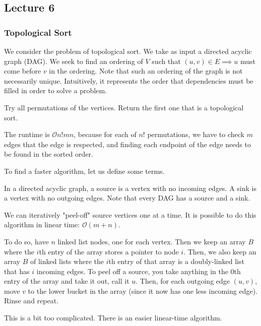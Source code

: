 \subsection{Lecture 6}

\subsubsection{Topological Sort}

We consider the problem of topological sort. We take as input a directed acyclic graph (DAG).
We seek to find an ordering of $V$ such that $(u, v) \in E \implies u$ must come before $v$ in the ordering. Note that such an ordering of the graph
is not necessarily unique. Intuitively, it represents the order that dependencies must be filled in order to solve a problem.


\begin{algothm} 
    Try all permutations of the vertices. Return the first one that is a topological sort.

    The runtime is $\mathcal{O}{n!mn}$, because for each of $n!$ permutations, we have to check $m$ edges that the edge is respected, and finding each endpoint
    of the edge needs to be found in the sorted order.
\end{algothm}

To find a faster algorithm, let us define some terms.

\begin{definition}
    In a directed acyclic graph, a source is a vertex with no incoming edges. A sink is a vertex with no outgoing edges.
    Note that every DAG has a source and a sink.
\end{definition}

\begin{algothm}
    We can iteratively "peel-off" source vertices one at a time. It is possible to do this algorithm in linear time: $\mathcal{O}(m + n)$.

    To do so, have $n$ linked list nodes, one for each vertex. Then we keep an array $B$ where the $i$th entry of the array stores a pointer to node $i$.
    Then, we also keep an array $B$ of linked lists where the $i$th entry of that array is a doubly-linked list that has $i$ incoming edges.
    To peel off a source, you take anything in the $0$th entry of the array and take it out, call it $u$. Then, for each outgoing edge $(u, v)$, move $v$
    to the lower bucket in the array (since it now has one less incoming edge). Rinse and repeat.

    This is a bit too complicated. There is an easier linear-time algorithm.
\end{algothm}

